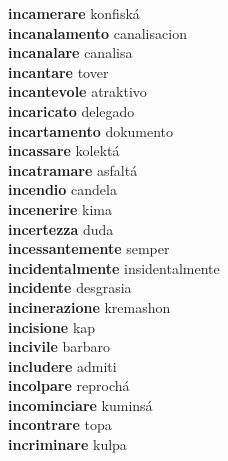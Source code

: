 \textbf{incamerare } konfiská \\
\textbf{incanalamento } canalisacion \\
\textbf{incanalare } canalisa \\
\textbf{incantare } tover \\
\textbf{incantevole } atraktivo \\
\textbf{incaricato } delegado \\
\textbf{incartamento } dokumento \\
\textbf{incassare } kolektá \\
\textbf{incatramare } asfaltá \\
\textbf{incendio } candela \\
\textbf{incenerire } kima \\
\textbf{incertezza } duda \\
\textbf{incessantemente } semper \\
\textbf{incidentalmente } insidentalmente \\
\textbf{incidente } desgrasia \\
\textbf{incinerazione } kremashon \\
\textbf{incisione } kap \\
\textbf{incivile } barbaro \\
\textbf{includere } admiti \\
\textbf{incolpare } reprochá \\
\textbf{incominciare } kuminsá \\
\textbf{incontrare } topa \\
\textbf{incriminare } kulpa \\
